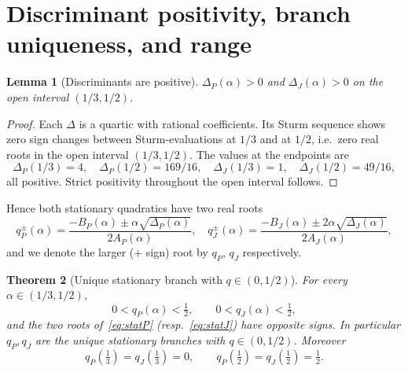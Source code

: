 \documentclass[11pt]{amsart}
\newtheorem{theorem}{Theorem}[section]
\newtheorem{lemma}[theorem]{Lemma}
\theoremstyle{definition}
\begin{document}
\section{Discriminant positivity, branch uniqueness, and range}
\label{sec:branch}

\begin{lemma}[Discriminants are positive]
\label{lem:disc-positive}
$\Delta_P(\alpha) > 0$ and $\Delta_J(\alpha) > 0$ on the open interval
$(1/3,1/2)$.
\end{lemma}

\begin{proof}
Each $\Delta$ is a quartic with rational coefficients.  Its Sturm sequence
shows zero sign changes between Sturm-evaluations at $1/3$ and at $1/2$,
i.e.\ zero real roots in the open interval $(1/3,1/2)$.  The values at the
endpoints are
\[
   \Delta_P(1/3) = 4,\quad \Delta_P(1/2) = 169/16,\quad
   \Delta_J(1/3) = 1,\quad \Delta_J(1/2) = 49/16,
\]
all positive.  Strict positivity throughout the open interval follows.
\end{proof}

Hence both stationary quadratics have two real roots
\[
   q^{\pm}_P(\alpha) = \frac{-B_P(\alpha)\pm\alpha\sqrt{\Delta_P(\alpha)}}{2A_P(\alpha)},
   \quad
   q^{\pm}_J(\alpha) = \frac{-B_J(\alpha)\pm 2\alpha\sqrt{\Delta_J(\alpha)}}{2A_J(\alpha)},
\]
and we denote the larger ($+$ sign) root by $q_P$, $q_J$ respectively.

\begin{theorem}[Unique stationary branch with $q\in(0,1/2)$]
\label{thm:branch-range}
For every $\alpha\in(1/3,1/2)$,
\[
   0 < q_P(\alpha) < \tfrac12,
   \qquad
   0 < q_J(\alpha) < \tfrac12,
\]
and the two roots of~\eqref{eq:statP} (resp.~\eqref{eq:statJ}) have opposite
signs.  In particular $q_P,q_J$ are the unique stationary branches with
$q\in(0,1/2)$. Moreover
\[
   q_P(\tfrac13) = q_J(\tfrac13) = 0,
   \qquad
   q_P(\tfrac12) = q_J(\tfrac12) = \tfrac12.
\]
\end{theorem}
\end{document}
